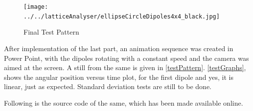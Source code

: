 		\begin{figure}[bth]
			\begin{center}
				\texttt{[image: ../../latticeAnalyser/ellipseCircleDipoles4x4\_black.jpg]}
			\end{center}
		\caption[Final Test Pattern]{Final Test Pattern}
		\label{testPattern}
		\end{figure}

		After implementation of the last part, an animation sequence was created in Power Point, with the dipoles rotating with a constant speed and the camera was aimed at the screen. A still from the same is given in \autoref{testPattern}. \autoref{testGraphs}, shows the angular position versus time plot, for the first dipole and yes, it is linear, just as expected. Standard deviation tests are still to be done.
		\par
		Following is the source code of the same, which has been made available online.
		
		
